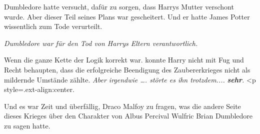 Dumbledore hatte versucht, dafür zu sorgen, dass Harrys Mutter verschont wurde.
Aber dieser Teil seines Plans war gescheitert. Und er hatte James Potter
wissentlich zum Tode verurteilt.

\emph{Dumbledore war für den Tod von Harrys Eltern verantwortlich.}

Wenn die ganze Kette der Logik korrekt war. konnte Harry nicht mit Fug und Recht
behaupten, dass die erfolgreiche Beendigung des Zaubererkrieges nicht als
mildernde Umstände zählte.  \emph{ Aber
irgendwie …. störte es ihn trotzdem....} \textbf{\emph{sehr}}\emph{.}   <p
style=\grqq{}.ext-align:center\grqq{}.

Und es war Zeit und überfällig, Draco Malfoy zu fragen, was die andere Seite
dieses Krieges über den Charakter von Albus Percival Wulfric Brian Dumbledore zu
sagen hatte.

